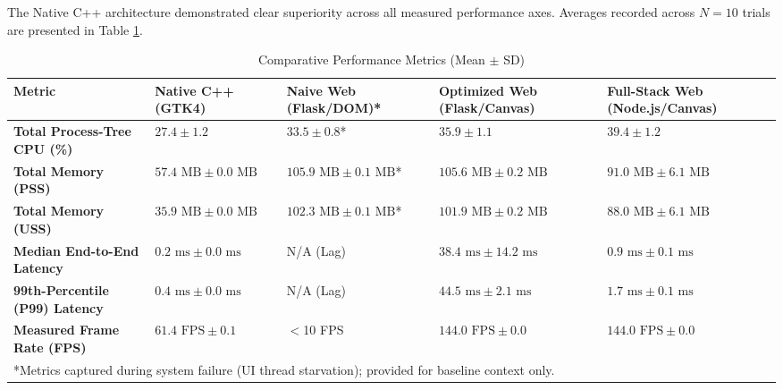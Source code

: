 \documentclass[lettersize,journal]{IEEEtran}
\begin{document}
The Native C++ architecture demonstrated clear superiority across all measured performance axes. Averages recorded across $N=10$ trials are presented in Table \ref{tab_metrics}.

\begin{table}[t]
\caption{Comparative Performance Metrics (Mean $\pm$ SD)}
\label{tab_metrics}
\begin{center}
\begin{tabular}{|p{130pt}|p{75pt}|p{85pt}|p{85pt}|p{85pt}|}
\hline
\textbf{Metric} & \textbf{Native C++ (GTK4)} & \textbf{Naive Web (Flask/DOM)*} & \textbf{Optimized Web (Flask/Canvas)} & \textbf{Full-Stack Web (Node.js/Canvas)} \\
\hline
\textbf{Total Process-Tree CPU (\%)} & $27.4 \pm 1.2$ & $33.5 \pm 0.8$* & $35.9 \pm 1.1$ & $39.4 \pm 1.2$ \\
\hline
\textbf{Total Memory (PSS)} & $57.4 \text{ MB} \pm 0.0 \text{ MB}$ & $105.9 \text{ MB} \pm 0.1 \text{ MB}$* & $105.6 \text{ MB} \pm 0.2 \text{ MB}$ & $91.0 \text{ MB} \pm 6.1 \text{ MB}$ \\
\hline
\textbf{Total Memory (USS)} & $35.9 \text{ MB} \pm 0.0 \text{ MB}$ & $102.3 \text{ MB} \pm 0.1 \text{ MB}$* & $101.9 \text{ MB} \pm 0.2 \text{ MB}$ & $88.0 \text{ MB} \pm 6.1 \text{ MB}$ \\
\hline
\textbf{Median End-to-End Latency} & $0.2 \text{ ms} \pm 0.0 \text{ ms}$ & N/A (Lag) & $38.4 \text{ ms} \pm 14.2 \text{ ms}$ & $0.9 \text{ ms} \pm 0.1 \text{ ms}$ \\
\hline
\textbf{99th-Percentile (P99) Latency} & $0.4 \text{ ms} \pm 0.0 \text{ ms}$ & N/A (Lag) & $44.5 \text{ ms} \pm 2.1 \text{ ms}$ & $1.7 \text{ ms} \pm 0.1 \text{ ms}$ \\
\hline
\textbf{Measured Frame Rate (FPS)} & $61.4 \text{ FPS} \pm 0.1$ & $<$10 FPS & $144.0 \text{ FPS} \pm 0.0$ & $144.0 \text{ FPS} \pm 0.0$ \\
\hline
\multicolumn{5}{p{450pt}}{*Metrics captured during system failure (UI thread starvation); provided for baseline context only.}
\end{tabular}
\end{center}
\end{table}
\end{document}
